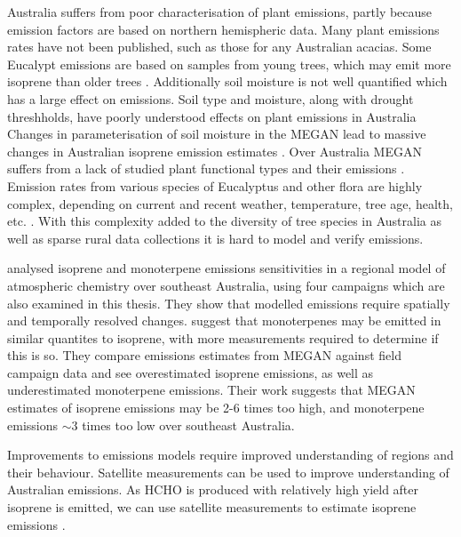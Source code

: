     
    Australia suffers from poor characterisation of plant emissions, partly because emission factors are based on northern hemispheric data.
    Many plant emissions rates have not been published, such as those for any Australian acacias.
    Some Eucalypt emissions are based on samples from young trees, which may emit more isoprene than older trees \parencite{Emmerson2016}.
    Additionally soil moisture is not well quantified which has a large effect on emissions.
    Soil type and moisture, along with drought threshholds, have poorly understood effects on plant emissions in Australia
    Changes in parameterisation of soil moisture in the MEGAN lead to massive changes in Australian isoprene emission estimates \parencite{Sindelarova2014}.
    Over Australia MEGAN suffers from a lack of studied plant functional types and their emissions \parencite[eg.][]{Muller2008}.
    Emission rates from various species of Eucalyptus and other flora are highly complex, depending on current and recent weather, temperature, tree age, health, etc. \parencite{Guenther2012}. 
    With this complexity added to the diversity of tree species in Australia as well as sparse rural data collections it is hard to model and verify emissions.
       
    \textcite{Emmerson2016} %
    analysed isoprene and monoterpene emissions sensitivities in a regional model of atmospheric chemistry over southeast Australia, using four campaigns which are also examined in this thesis.
    They show that modelled emissions require spatially and temporally resolved changes.
    \textcite{Emmerson2016} suggest that monoterpenes may be emitted in similar quantites to isoprene, with more measurements required to determine if this is so.
    They compare emissions estimates from MEGAN against field campaign data and see overestimated isoprene emissions, as well as underestimated monoterpene emissions.
    Their work suggests that MEGAN estimates of isoprene emissions may be 2-6 times too high, and monoterpene emissions $\sim3$ times too low over southeast Australia.
    
    
    Improvements to emissions models require improved understanding of regions and their behaviour.
    Satellite measurements can be used to improve understanding of Australian emissions.
    As HCHO is produced with relatively high yield after isoprene is emitted, we can use satellite measurements to estimate isoprene emissions \parencite[e.g.]{Palmer2001, Millet2006, Bauwens2016}.
    
